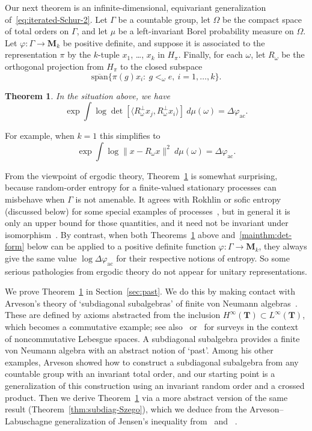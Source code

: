 \documentclass[12pt,a4paper]{article}
\numberwithin{equation}{section}
\newtheorem{mainthm}{Theorem}
\theoremstyle{remark}
\renewcommand{\rm}[1]{\mathrm{#1}}
\newcommand{\bbT}{\mathbf{T}}
\newcommand{\rmM}{\mathbf{M}}
\newcommand{\G}{\Gamma}
\renewcommand{\phi}{\varphi}
\newcommand{\ol}[1]{\overline{#1}}
\begin{document}
Our next theorem is an infinite-dimensional, equivariant generalization of~\eqref{eq:iterated-Schur-2}.  Let $\G$ be a countable group, let $\Omega$ be the compact space of total orders on $\G$, and let $\mu$ be a left-invariant Borel probability measure on $\Omega$.  Let $\phi:\G\to \rmM_k$ be positive definite, and suppose it is associated to the representation $\pi$ by the $k$-tuple $x_1$, \dots, $x_k$ in $H_\pi$.  Finally, for each $\omega$, let $R_\omega$ be the orthogonal projection from $H_\pi$ to the closed subspace
\[\ol{\rm{span}}\{\pi(g)x_i:\ g <_\omega e,\ i=1,\dots,k\}.\]

\begin{mainthm}\label{mainthm:past}
In the situation above, we have
\begin{equation}\label{eq:past}
\exp\int \log \det [\langle R_\omega^\perp x_j,R_\omega^\perp x_i\rangle]\ d\mu(\omega) = \Delta \phi_{\rm{ac}}.
\end{equation}
\end{mainthm}

For example, when $k=1$ this simplifies to
\[\exp\int \log \|x - R_\omega x\|^2\ d\mu(\omega) = \Delta \phi_{\rm{ac}}.\]

From the viewpoint of ergodic theory, Theorem~\ref{mainthm:past} is somewhat surprising, because random-order entropy for a finite-valued stationary processes can misbehave when $\G$ is not amenable.  It agrees with Rokhlin or sofic entropy (discussed below) for some special examples of processes~\cite{AusPod--percolative,Alp--randomorder}, but in general it is only an upper bound for those quantities, and it need not be invariant under isomorphism~\cite[Sec. 7]{Seward--randomorder}.  By contrast, when both Theorems~\ref{mainthm:past} above and~\ref{mainthm:det-form} below can be applied to a positive definite function $\phi:\G\to\rmM_k$, they always give the same value $\log\Delta \phi_{\rm{ac}}$ for their respective notions of entropy.  So some serious pathologies from ergodic theory do not appear for unitary representations.

We prove Theorem~\ref{mainthm:past} in Section~\ref{sec:past}.  We do this by making contact with Arveson's theory of `subdiagonal subalgebras' of finite von Neumann algebras~\cite{Arv67}.  These are defined by axioms abstracted from the inclusion $H^\infty(\bbT) \subset L^\infty(\bbT)$, which becomes a commutative example; see also~\cite[Sec. 8]{PisXuNCLP} or~\cite{BlecLab07b} for surveys in the context of noncommutative Lebesgue spaces.  A subdiagonal subalgebra provides a finite von Neumann algebra with an abstract notion of `past'.  Among his other examples, Arveson showed how to construct a subdiagonal subalgebra from any countable group with an invariant total order, and our starting point is a generalization of this construction using an invariant random order and a crossed product.  Then we derive Theorem~\ref{mainthm:past} via a more abstract version of the same result (Theorem~\ref{thm:subdiag-Szego}), which we deduce from the Arveson--Labuschagne generalization of Jensen's inequality from~\cite{Arv67} and ~\cite{Lab05}.
\end{document}
